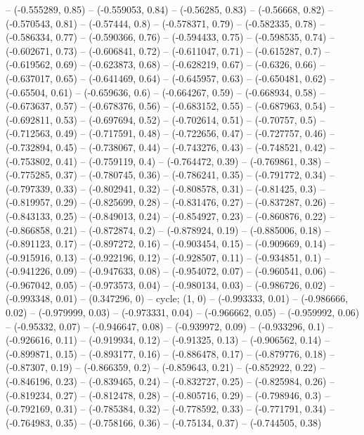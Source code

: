 -- (-0.555289, 0.85)
-- (-0.559053, 0.84)
-- (-0.56285, 0.83)
-- (-0.56668, 0.82)
-- (-0.570543, 0.81)
-- (-0.57444, 0.8)
-- (-0.578371, 0.79)
-- (-0.582335, 0.78)
-- (-0.586334, 0.77)
-- (-0.590366, 0.76)
-- (-0.594433, 0.75)
-- (-0.598535, 0.74)
-- (-0.602671, 0.73)
-- (-0.606841, 0.72)
-- (-0.611047, 0.71)
-- (-0.615287, 0.7)
-- (-0.619562, 0.69)
-- (-0.623873, 0.68)
-- (-0.628219, 0.67)
-- (-0.6326, 0.66)
-- (-0.637017, 0.65)
-- (-0.641469, 0.64)
-- (-0.645957, 0.63)
-- (-0.650481, 0.62)
-- (-0.65504, 0.61)
-- (-0.659636, 0.6)
-- (-0.664267, 0.59)
-- (-0.668934, 0.58)
-- (-0.673637, 0.57)
-- (-0.678376, 0.56)
-- (-0.683152, 0.55)
-- (-0.687963, 0.54)
-- (-0.692811, 0.53)
-- (-0.697694, 0.52)
-- (-0.702614, 0.51)
-- (-0.70757, 0.5)
-- (-0.712563, 0.49)
-- (-0.717591, 0.48)
-- (-0.722656, 0.47)
-- (-0.727757, 0.46)
-- (-0.732894, 0.45)
-- (-0.738067, 0.44)
-- (-0.743276, 0.43)
-- (-0.748521, 0.42)
-- (-0.753802, 0.41)
-- (-0.759119, 0.4)
-- (-0.764472, 0.39)
-- (-0.769861, 0.38)
-- (-0.775285, 0.37)
-- (-0.780745, 0.36)
-- (-0.786241, 0.35)
-- (-0.791772, 0.34)
-- (-0.797339, 0.33)
-- (-0.802941, 0.32)
-- (-0.808578, 0.31)
-- (-0.81425, 0.3)
-- (-0.819957, 0.29)
-- (-0.825699, 0.28)
-- (-0.831476, 0.27)
-- (-0.837287, 0.26)
-- (-0.843133, 0.25)
-- (-0.849013, 0.24)
-- (-0.854927, 0.23)
-- (-0.860876, 0.22)
-- (-0.866858, 0.21)
-- (-0.872874, 0.2)
-- (-0.878924, 0.19)
-- (-0.885006, 0.18)
-- (-0.891123, 0.17)
-- (-0.897272, 0.16)
-- (-0.903454, 0.15)
-- (-0.909669, 0.14)
-- (-0.915916, 0.13)
-- (-0.922196, 0.12)
-- (-0.928507, 0.11)
-- (-0.934851, 0.1)
-- (-0.941226, 0.09)
-- (-0.947633, 0.08)
-- (-0.954072, 0.07)
-- (-0.960541, 0.06)
-- (-0.967042, 0.05)
-- (-0.973573, 0.04)
-- (-0.980134, 0.03)
-- (-0.986726, 0.02)
-- (-0.993348, 0.01)
-- (0.347296, 0)
-- cycle;
\drawBand (1, 0)
-- (-0.993333, 0.01)
-- (-0.986666, 0.02)
-- (-0.979999, 0.03)
-- (-0.973331, 0.04)
-- (-0.966662, 0.05)
-- (-0.959992, 0.06)
-- (-0.95332, 0.07)
-- (-0.946647, 0.08)
-- (-0.939972, 0.09)
-- (-0.933296, 0.1)
-- (-0.926616, 0.11)
-- (-0.919934, 0.12)
-- (-0.91325, 0.13)
-- (-0.906562, 0.14)
-- (-0.899871, 0.15)
-- (-0.893177, 0.16)
-- (-0.886478, 0.17)
-- (-0.879776, 0.18)
-- (-0.87307, 0.19)
-- (-0.866359, 0.2)
-- (-0.859643, 0.21)
-- (-0.852922, 0.22)
-- (-0.846196, 0.23)
-- (-0.839465, 0.24)
-- (-0.832727, 0.25)
-- (-0.825984, 0.26)
-- (-0.819234, 0.27)
-- (-0.812478, 0.28)
-- (-0.805716, 0.29)
-- (-0.798946, 0.3)
-- (-0.792169, 0.31)
-- (-0.785384, 0.32)
-- (-0.778592, 0.33)
-- (-0.771791, 0.34)
-- (-0.764983, 0.35)
-- (-0.758166, 0.36)
-- (-0.75134, 0.37)
-- (-0.744505, 0.38)
